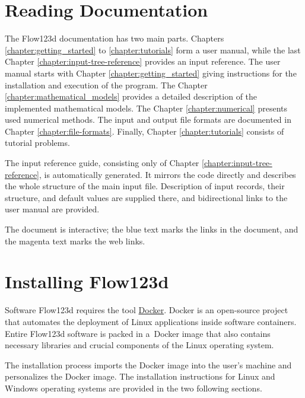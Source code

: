 \section{Reading Documentation}
The Flow123d documentation has two main parts. Chapters \ref{chapter:getting_started} to \ref{chapter:tutorials} form a user
manual, while the last Chapter \ref{chapter:input-tree-reference} provides an input reference.
The user manual starts with Chapter \ref{chapter:getting_started} giving instructions for the installation and execution of the program.
The Chapter \ref{chapter:mathematical_models} provides a detailed description of the implemented mathematical models. The
Chapter \ref{chapter:numerical} presents used numerical methods.
The input and output file formats are documented in Chapter \ref{chapter:file-formats}.
Finally, Chapter \ref{chapter:tutorials} consists of tutorial problems.

The input reference guide, consisting only of Chapter \ref{chapter:input-tree-reference}, is automatically generated.
It mirrors the code directly and describes the whole structure of the main input file. Description
of input records, their structure, and default values are supplied there, and bidirectional links to the user manual are provided.

The document is interactive; the {\color{blue}blue text} marks the links in the document, and the {\color{magenta}magenta text} marks the web links.




\section{Installing Flow123d}
Software Flow123d requires the tool \href{https://www.docker.com}{Docker}. Docker is an open-source project that automates
the deployment of Linux applications inside software containers. Entire Flow123d software is packed in a~Docker image that
also contains necessary libraries and crucial components of the Linux operating system.

The installation process imports the Docker image into the user's machine and personalizes the Docker image.
The installation instructions for Linux and Windows operating systems are provided in the two following sections.


